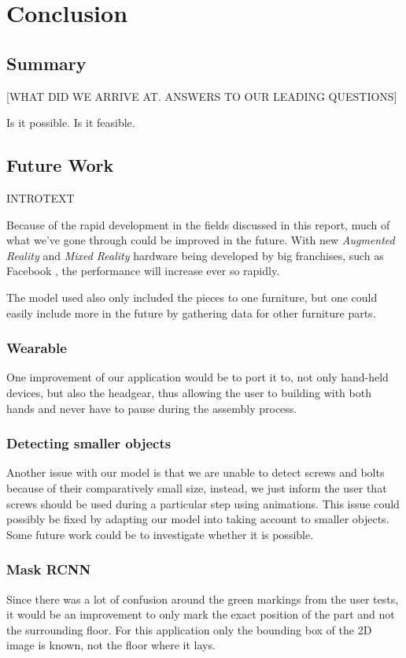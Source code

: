 \section{Conclusion}

\subsection{Summary}
[WHAT DID WE ARRIVE AT. ANSWERS TO OUR LEADING QUESTIONS]

Is it possible. Is it feasible.




\subsection{Future Work}
INTROTEXT

Because of the rapid development in the fields discussed in this report, much of what we've gone through could be improved in the future. With new \textit{Augmented Reality} and \textit{Mixed Reality} hardware being developed by big franchises, such as Facebook \cite{facebookAR}, the performance will increase ever so rapidly.

The model used also only included the pieces to one furniture, but one could easily include more in the future by gathering data for other furniture parts.

\subsubsection{Wearable}
One improvement of our application would be to port it to, not only hand-held devices, but also the headgear, thus allowing the user to building with both hands and never have to pause during the assembly process.

\subsubsection{Detecting smaller objects}
Another issue with our model is that we are unable to detect screws and bolts because of their 
comparatively small size, instead, we just inform the user that screws should be used during a particular step using animations.
This issue could possibly be fixed by adapting our model into taking account to smaller objects.
Some future work could be to investigate whether it is possible.

\subsubsection{Mask RCNN}
Since there was a lot of confusion around the green markings from the user tests, it would be an
improvement to only mark the exact position of the part and not the surrounding floor.
For this application only the bounding box of the 2D image is known, not the floor where it lays.

